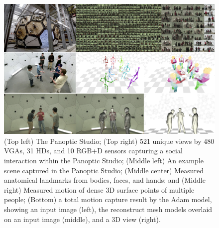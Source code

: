 	



\begin{figure}[t]
	\centering
	\includegraphics[width=\textwidth]{figures/teaser_4}
	\caption{(Top left) The Panoptic Studio; (Top right) 521 unique views by 480 VGAs, 31 HDs, and 10 RGB+D sensors capturing a social interaction within the Panoptic Studio; (Middle left) An example scene captured in the Panoptic Studio; (Middle center) Measured anatomical landmarks from bodies, faces, and hands; and (Middle right) Measured motion of dense 3D surface points of multiple people; (Bottom) a total motion capture result by the Adam model, showing an input image (left), the reconstruct mesh models overlaid on an input image (middle), and a 3D view (right).}	
	\label{fig:teaser}
\end{figure}


